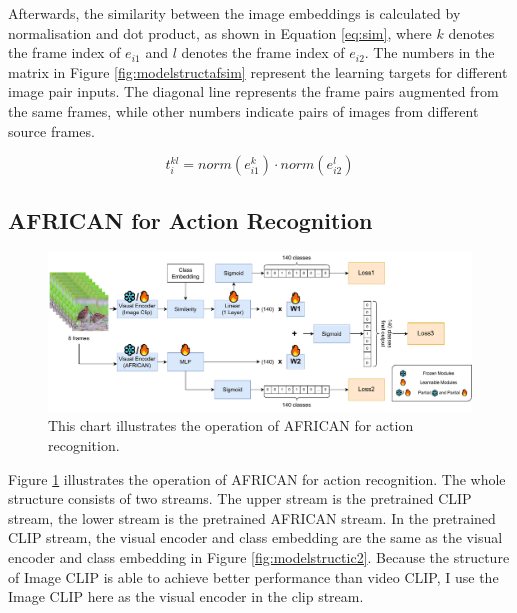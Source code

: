 Afterwards, the similarity between the image embeddings is calculated by normalisation and dot product, as shown in Equation \ref{eq:sim}, where $k$ denotes the frame index of $e_{i1}$ and $l$ denotes the frame index of $e_{i2}$. The numbers in the matrix in Figure \ref{fig:modelstructafsim} represent the learning targets for different image pair inputs. The diagonal line represents the frame pairs augmented from the same frames, while other numbers indicate pairs of images from different source frames. 

\begin{equation}
    \label{eq:sim}
    t_{i}^{kl} = norm(e_{i1}^{k}) \cdot norm(e_{i2}^{l})
\end{equation}




\subsection{AFRICAN for Action Recognition}

\begin{figure}[ht]
    \centering
    \includegraphics[width=1.0\textwidth]{assets/imgs/3_4_ModelStructureAF}
    \caption[Operation of AFRICAN for action recognition]{This chart illustrates the operation of AFRICAN for action recognition.}
    \label{fig:modelstructaf_ar}
\end{figure}

Figure \ref{fig:modelstructaf_ar} illustrates the operation of AFRICAN for action recognition. The whole structure consists of two streams. The upper stream is the pretrained CLIP stream, the lower stream is the pretrained AFRICAN stream.
In the pretrained CLIP stream, the visual encoder and class embedding are the same as the visual encoder and class embedding in Figure \ref{fig:modelstructic2}. Because the structure of Image CLIP is able to achieve better performance than video CLIP, I use the Image CLIP here as the visual encoder in the clip stream. 

